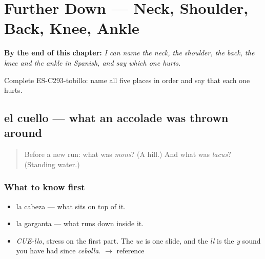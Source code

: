 
\chapter{Further Down --- Neck, Shoulder, Back, Knee, Ankle}
\label{ch:mas-del-cuerpo}

\begin{chapteropening}
\textbf{By the end of this chapter:} \emph{I can name the neck, the shoulder, the back, the knee and the ankle in Spanish, and say which one hurts.}

Complete ES-C293-tobillo: name all five places in order and say that each one hurts.
\end{chapteropening}

\section[el cuello]{el cuello — what an accolade was thrown around}

\label{lesson:ES-C293-cuello}



\begin{quote}
Before a new run: what was \emph{mons}? (A hill.) And what was \emph{lacus}? (Standing water.)
\end{quote}

\subsection*{What to know first}
\begin{itemize}
\raggedright
  \item la cabeza — what sits on top of it.
  \item la garganta — what runs down inside it.
\end{itemize}

\begin{sounds}
\begin{itemize}
\raggedright
  \item \emph{CUE-llo}, stress on the first part. The \emph{ue} is one slide, and the \emph{ll} is the \emph{y} sound you have had since \emph{cebolla}. $\to$ reference
\end{itemize}
\end{sounds}

